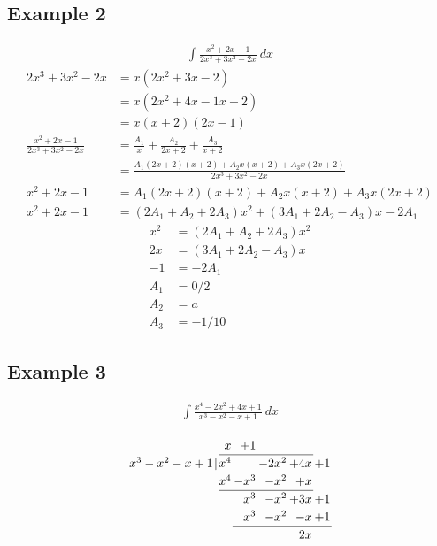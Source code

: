\documentclass{article}
\theoremstyle{mytheoremstyle}
\theoremstyle{mytheoremstyle}
\theoremstyle{myproblemstyle}
\begin{document}
    \subsection*{Example 2}
    \begin{align*}
        \int \frac{x^2+2x-1}{2x^3+3x^2-2x} \ dx
    \end{align*}
    \begin{align*}
        2x^3+3x^2-2x
        &= x(2x^2+3x-2) \\
        &= x(2x^2 +4x-1x-2) \\
        &= x(x+2)(2x-1) \\
        \frac{x^2+2x-1}{2x^3+3x^2-2x}
        &= \frac{A_1}{x} + \frac{A_2}{2x+2} + \frac{A_3}{x+2} \\
        &= \frac{A_1(2x+2)(x+2) + A_2x(x+2) + A_3x(2x+2)}{2x^3+3x^2-2x} \\
        x^2+2x-1 &= A_1(2x+2)(x+2) + A_2x(x+2) + A_3x(2x+2) \\
        x^2+2x-1
        &=
        (2A_1+A_2+2A_3)x^2 + (3A_1+2A_2 - A_3)x - 2A_1
    \end{align*}
    \begin{align*}
        x^2 &= (2A_1+A_2+2A_3)x^2 \\
        2x &= (3A_1+2A_2 - A_3)x \\
        -1 &= - 2A_1 \\
        A_1 &= 0/2 \\
        A_2 &= a \\
        A_3 &= -1/10
    \end{align*}

    \subsection*{Example 3}
    \begin{align*}
        \int \frac{x^4-2x^2+4x+1}{x^3-x^2-x+1} \ dx
    \end{align*}

    \begin{align*}
        \arraycolsep=1pt
        \renewcommand\arraystretch{1.2}
        \begin{array}{*1r @{\hskip\arraycolsep}c@{\hskip\arraycolsep} *{11}r}
                        &   & x   & +1   &        &     & \\
            \cline{3-6}
            x^3-x^2-x+1 & | & x^4 &      & -2x^2  & +4x & +1 \\
                        &   & x^4 & -x^3 & -x^2   & +x  & \\
                        \cline{3-6}
                        &   &     & x^3  & -x^2   & +3x & +1  \\
                        &   &     & x^3  & -x^2   & -x  & + 1 \\
                        \cline{4-7}
                        &   &     &      &        & 2x  &
        \end{array}
    \end{align*}
\end{document}
